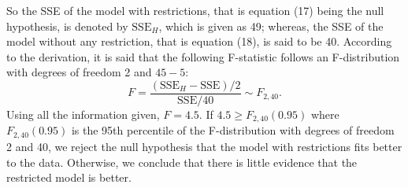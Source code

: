 \documentclass[answers]{exam}
\begin{document}
\begin{questions}
\begin{solution}
$$    $$
    So the SSE of the model with restrictions, that is equation (17) being the null hypothesis, is denoted by $\mathrm{SSE}_{H}$, which is given as 49; whereas, the SSE of the model without any restriction, that is equation (18), is said to be 40. According to the derivation, it is said that the following F-statistic follows an F-distribution with degrees of freedom 2 and $45-5$:
    $$
      F=\dfrac{\left(\mathrm{SSE}_{H}-\mathrm{SSE}\right)/2}{\mathrm{SSE}/40} \sim F_{2,40}.
    $$
    Using all the information given, $F=4.5$. If $4.5 \geq F_{2,40}\left(0.95\right)$ where $F_{2,40}\left(0.95\right)$ is the 95th percentile of the F-distribution with degrees of freedom 2 and 40, we reject the null hypothesis that the model with restrictions fits better to the data. Otherwise, we conclude that there is little evidence that the restricted model is better.
   \end{solution}
\end{questions}
\end{document}
